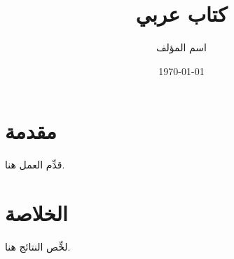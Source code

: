\documentclass[11pt]{book}
\title{كتاب عربي}
\author{اسم المؤلف}
\date{\today}
\begin{document}
\maketitle
\tableofcontents

\chapter{مقدمة}
قدِّم العمل هنا.

\chapter{الخلاصة}
لخِّص النتائج هنا.
\end{document}
